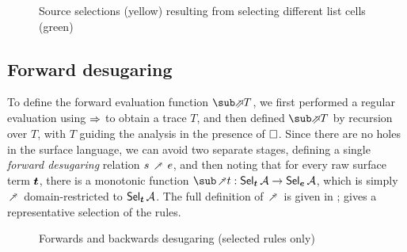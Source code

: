 \begin{figure}
   \begin{subfigure}{0.48\textwidth}
      \small
      
   \end{subfigure}
   \hfill
   \begin{subfigure}{0.48\textwidth}
      \small
      
      \end{subfigure}
   \caption{Source selections (yellow) resulting from selecting different list cells (green)}
\label{fig:surface-language:example-1}
\end{figure}

\subsection{Forward desugaring}

To define the forward evaluation function $\evalFwdF{T}$, we first performed a regular evaluation using $\Rightarrow$ to obtain a trace $T$, and then defined $\evalFwdF{T}$ by recursion over $T$, with $T$ guiding the analysis in the presence of $\square$. Since there are no holes in the surface language, we can avoid two separate stages, defining a single \emph{forward desugaring} relation $s \desugarFwdR e$, and then noting that for every raw surface term $\bm{t}$, there is a monotonic function $\desugarFwdF{t}: \Sel{\raw{t}}{A} \to \Sel{\raw{e}}{A}$, which is simply $\desugarFwdR$ domain-restricted to $\textup{\textsf{Sel}}_{\bm{t}}\,{\mathcal{A}}$. The full definition of $\desugarFwdR$ is \ifappendices given in  \else \IncludedWithSupplementaryMaterial \fi;  gives a representative selection of the rules.

\begin{figure}
   
   \caption{Forwards and backwards desugaring (selected rules only)}
   \label{fig:surface-language:desugar}
\end{figure}

